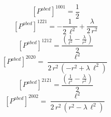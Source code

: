 \documentclass[11pt]{article}
\begin{document}
\begin{dmath*}[breakdepth={5}]
\left[P^{abcd}\right]^{1001} = \frac{1}{2}
\end{dmath*}
\begin{dmath*}[breakdepth={5}]
\left[P^{abcd}\right]^{1221} = -\frac{1}{2\,{\ell}^{2}} + \frac{\lambda}{2\,{r}^{2}}
\end{dmath*}
\begin{dmath*}[breakdepth={5}]
\left[P^{abcd}\right]^{1212} = \frac{\left(\frac{1}{{\ell}^{2}} - \frac{\lambda}{{r}^{2}}\right)}{2}
\end{dmath*}
\begin{dmath*}[breakdepth={5}]
\left[P^{abcd}\right]^{2020} = \frac{{\ell}^{2}}{2\,{r}^{2}\,\left(-{r}^{2} + \lambda\,{\ell}^{2}\right)}
\end{dmath*}
\begin{dmath*}[breakdepth={5}]
\left[P^{abcd}\right]^{2121} = \frac{\left(\frac{1}{{\ell}^{2}} - \frac{\lambda}{{r}^{2}}\right)}{2}
\end{dmath*}
\begin{dmath*}[breakdepth={5}]
\left[P^{abcd}\right]^{2002} = \frac{{\ell}^{2}}{2\,{r}^{2}\,\left({r}^{2} - \lambda\,{\ell}^{2}\right)}
\end{dmath*}
\end{document}
